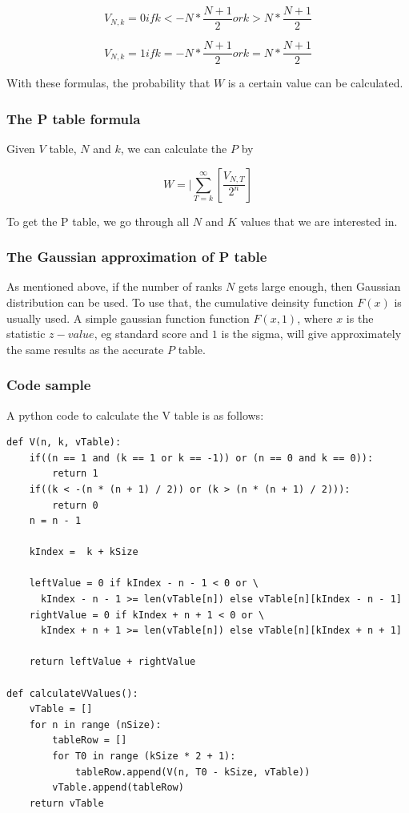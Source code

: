 \documentclass[12pt]{article}
\begin{document}
\begin{equation}
V_{N, k} = 0 if k < -N * \frac{N+1}{2} or k > N * \frac{N+1}{2}
\end{equation}

\begin{equation}
V_{N, k} = 1 if k = -N * \frac{N+1}{2} or k = N * \frac{N+1}{2}
\end{equation}

With these formulas, the probability that $W$ is a certain value can be calculated.

\subsubsection{The P table formula}
Given $V$ table, $N$ and $k$, we can calculate the $P$ by

\begin{equation}
W=|\sum\limits_{T = k}^{\infty}[\frac{V_{N, T}}{2^n}]
\end{equation}

To get the P table, we go through all $N$ and $K$ values that we are interested in.

\subsubsection{The Gaussian approximation of P table}
As mentioned above, if the number of ranks $N$ gets large enough, then Gaussian distribution can be used. To use that, the cumulative deinsity function $F(x)$ is usually used. A simple gaussian function function $F(x, 1)$, where $x$ is the statistic $z-value$, eg standard score and $1$ is the sigma, will give approximately the same results as the accurate $P$ table.

\subsubsection{Code sample}
A python code to calculate the V table is as follows:
\begin{verbatim}
def V(n, k, vTable):
    if((n == 1 and (k == 1 or k == -1)) or (n == 0 and k == 0)):
        return 1
    if((k < -(n * (n + 1) / 2)) or (k > (n * (n + 1) / 2))):
        return 0
    n = n - 1

    kIndex =  k + kSize

    leftValue = 0 if kIndex - n - 1 < 0 or \
      kIndex - n - 1 >= len(vTable[n]) else vTable[n][kIndex - n - 1]
    rightValue = 0 if kIndex + n + 1 < 0 or \
      kIndex + n + 1 >= len(vTable[n]) else vTable[n][kIndex + n + 1]

    return leftValue + rightValue

def calculateVValues():
    vTable = []
    for n in range (nSize):
        tableRow = []
        for T0 in range (kSize * 2 + 1):
            tableRow.append(V(n, T0 - kSize, vTable))
        vTable.append(tableRow)
    return vTable

\end{verbatim}
\end{document}
